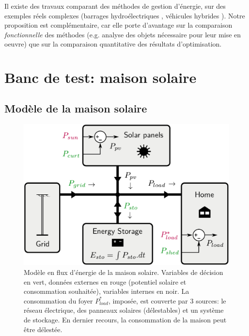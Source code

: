 \documentclass[a4paper,10pt,twocolumn]{article}
\begin{document}
Il existe des travaux comparant des méthodes de gestion d'énergie, sur des exemples réels complexes
(barrages hydroélectriques \cite{Zambelli:2011:SBA}, véhicules hybrides \cite{Jiang:2017:ToVT}).
Notre proposition est complémentaire, car elle porte d'avantage sur la comparaison \emph{fonctionnelle}
des méthodes (e.g. analyse des objets nécessaire pour leur mise en oeuvre) que
sur la comparaison quantitative des résultats d'optimisation.

\section{Banc de test: maison solaire}

\subsection{Modèle de la maison solaire}

\begin{figure}[!ht]
        \begin{center}
                \includegraphics[width=0.9\columnwidth]{figures/solar_home.pdf}
        \end{center}

        \caption{Modèle en flux d'énergie de la maison solaire.
        Variables de décision en vert, données externes en rouge (potentiel solaire et consommation souhaitée), variables internes en noir.
        La consommation du foyer $P_{load}^*$, imposée, est couverte par 3 sources:
        le réseau électrique, des panneaux solaires (délestables)
        et un système de stockage.
        En dernier recours, la consommation de la maison peut être délestée.
        }
        \label{fig:solhome}
\end{figure}
\end{document}
